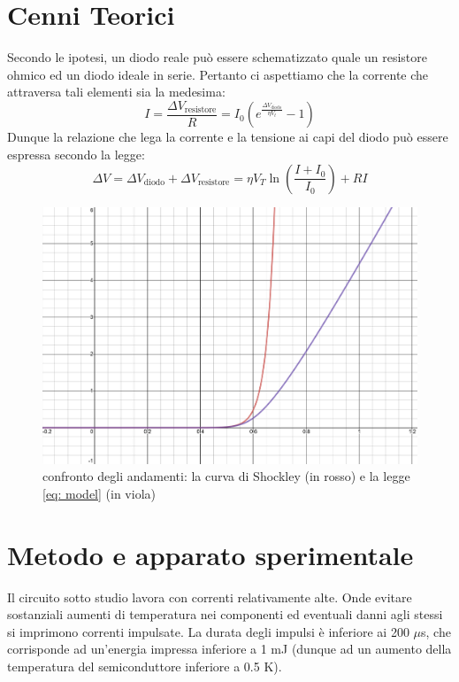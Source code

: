 \documentclass{article}[a4paper, oneside, 11pt]
\begin{document}
\section{Cenni Teorici}
Secondo le ipotesi, un diodo reale può essere schematizzato quale un resistore 
ohmico ed un diodo ideale in serie. Pertanto ci aspettiamo che la corrente che 
attraversa tali elementi sia la medesima:
\begin{equation}
	I = \frac{\Delta V_{\text{resistore}}}{R} =
	I_0 \left( e^{\frac{\Delta V_{\text{diodo}}}{\eta V_t}} - 1\right)
\end{equation}
Dunque la relazione che lega la corrente e la tensione ai capi del diodo può 
essere espressa secondo la legge:
\begin{equation}\label{eq: model}
	\Delta V = \Delta V_{\text{diodo}} + \Delta V_{\text{resistore}} = \eta 
V_T \ln{\left(\frac{
	I+I_0}{I_0}\right)} + RI
\end{equation}
\begin{figure}[!htbp]
	\centering 
 		\includegraphics[scale=0.25]{./confronto_curve.png}
 	\caption{confronto degli andamenti: la curva di Shockley (in rosso) e la 
legge \eqref{eq: model} (in viola)}
\end{figure}


\section{Metodo e apparato sperimentale}
Il circuito sotto studio lavora con correnti relativamente alte. Onde evitare 
sostanziali aumenti di temperatura nei componenti ed eventuali danni agli 
stessi si imprimono correnti impulsate.
La durata degli impulsi è inferiore ai 200 $\mu$s, che 
corrisponde ad un'energia impressa inferiore a 1 mJ (dunque ad un aumento della 
temperatura del semiconduttore inferiore a 0.5 K).
\end{document}
